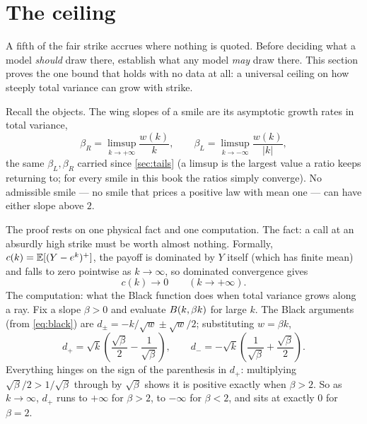 \section{The ceiling}
\label{sec:vsceiling}

A fifth of the fair strike accrues where nothing is quoted.  Before
deciding what a model \emph{should} draw there, establish what any
model \emph{may} draw there.  This section proves the one bound that
holds with no data at all: a universal ceiling on how steeply total
variance can grow with strike.

Recall the objects.  The wing slopes of a smile are its asymptotic
growth rates in total variance,
\[
\beta_R=\limsup_{k\to+\infty}\frac{w(k)}{k},
\qquad
\beta_L=\limsup_{k\to-\infty}\frac{w(k)}{|k|},
\]
the same $\beta_L,\beta_R$ carried since \cref{sec:tails} (a limsup is
the largest value a ratio keeps returning to; for every smile in this
book the ratios simply converge).  No admissible smile --- no smile
that prices a positive law with mean one --- can have either slope
above $2$.

The proof rests on one physical fact and one computation.  The fact:
a call at an absurdly high strike must be worth almost nothing.
Formally, $c(k)=\mathbb{E}[(Y-e^{k})^{+}]$, the payoff is dominated by $Y$
itself (which has finite mean) and falls to zero pointwise as
$k\to\infty$, so dominated convergence gives
\begin{equation}
c(k)\longrightarrow0
\qquad(k\to+\infty).
\label{eq:vscalldies}
\end{equation}
The computation: what the Black function does when total variance
grows along a ray.  Fix a slope $\beta>0$ and evaluate
$B(k,\beta k)$ for large $k$.  The Black arguments (from
\cref{eq:black}) are $d_{\pm}=-k/\sqrt{w}\pm\sqrt{w}/2$; substituting
$w=\beta k$,
\begin{equation}
d_{+}=\sqrt{k}\left(\frac{\sqrt\beta}{2}-\frac{1}{\sqrt\beta}\right),
\qquad
d_{-}=-\sqrt{k}\left(\frac{1}{\sqrt\beta}+\frac{\sqrt\beta}{2}\right).
\label{eq:vsray}
\end{equation}
Everything hinges on the sign of the parenthesis in $d_{+}$:
multiplying $\sqrt\beta/2>1/\sqrt\beta$ through by $\sqrt\beta$ shows
it is positive exactly when $\beta>2$.  So as $k\to\infty$, $d_{+}$
runs to $+\infty$ for $\beta>2$, to $-\infty$ for $\beta<2$, and sits
at exactly $0$ for $\beta=2$.

